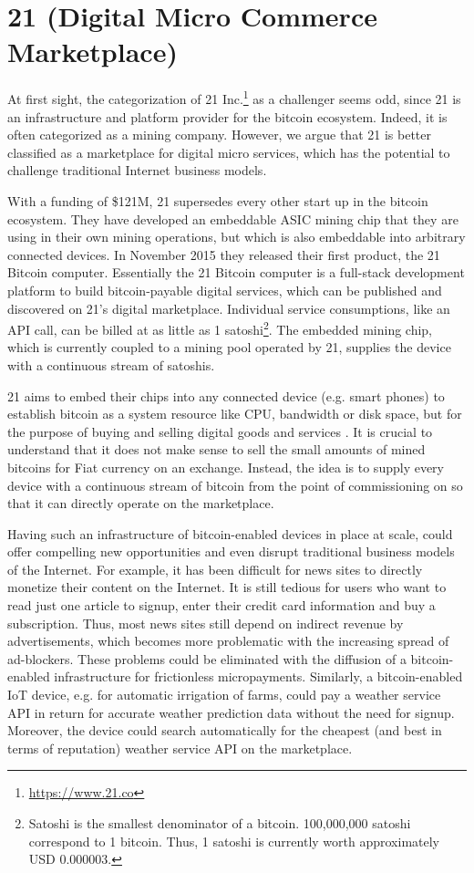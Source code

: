 \section{21 (Digital Micro Commerce Marketplace)}
\label{sec:eco21}

At first sight, the categorization of 21 Inc.\footnote{\url{https://www.21.co}} as a challenger seems odd, 
since 21 is an infrastructure and platform provider for the bitcoin ecosystem. 
Indeed, it is often categorized as a mining company. However, we argue that 21 
is better classified as a marketplace for digital micro services, which has the 
potential to challenge traditional Internet business models.

With a funding of \$121M, 21 supersedes every other start up in the bitcoin ecosystem. 
They have developed an embeddable \ac{ASIC} mining chip that they are using in their own mining operations, 
but which is also embeddable into arbitrary connected devices. In November 2015 
they released their first product, the 21 Bitcoin computer. Essentially the 21 
Bitcoin computer is a full-stack development platform to build bitcoin-payable 
digital services, which can be published and discovered on 21's digital marketplace. 
Individual service consumptions, like an \ac{API} call, can be billed at as little as 
1 satoshi\footnote{Satoshi is the smallest denominator of a bitcoin. 100,000,000 
satoshi correspond to 1 bitcoin. Thus, 1 satoshi is currently worth approximately 
USD 0.000003.}. The embedded mining chip, which is currently coupled to a mining 
pool operated by 21, supplies the device with 
a continuous stream of satoshis.

21 aims to embed their chips into any connected device (e.g. smart phones) to establish 
bitcoin as a system resource like CPU, bandwidth or disk space, but for the purpose 
of buying and selling digital goods and services \parencite{Balaji2015}. It is crucial 
to understand that it does not make sense to sell the small amounts of mined bitcoins 
for Fiat currency on an exchange. Instead, the idea is to supply every device with 
a continuous stream of bitcoin from the point of commissioning on so that it can 
directly operate on the marketplace. 

Having such an infrastructure of bitcoin-enabled devices in place at scale, could 
offer compelling new opportunities and even disrupt traditional business models 
of the Internet. For example, it has been difficult for news sites to directly 
monetize their content on the Internet. It is still tedious for users who want 
to read just one article to signup, enter their credit card information and buy 
a subscription. Thus, most news sites still depend on indirect revenue by advertisements, 
which becomes more problematic with the increasing spread of ad-blockers. These 
problems could be eliminated with the diffusion of a bitcoin-enabled infrastructure 
for frictionless micropayments. Similarly, a bitcoin-enabled IoT device, e.g. for 
automatic irrigation of farms, could pay a weather service API in return for accurate 
weather prediction data without the need for signup. Moreover, the device could 
search automatically for the cheapest (and best in terms of reputation) weather 
service API on the marketplace.

